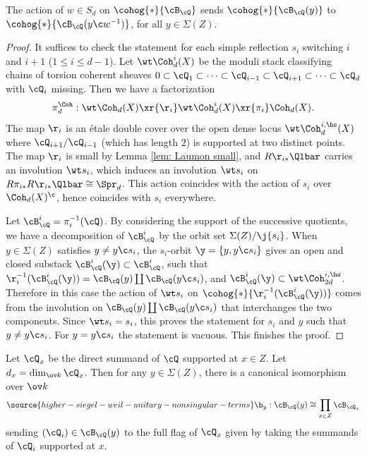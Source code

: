 \begin{lemma}
\notready\label{l:perm Coh}
The action of $w\in S_{d}$ on $\cohog{*}{\cB_{\cQ}}$ sends $\cohog{*}{\cB_{\cQ}(y)}$ to $\cohog{*}{\cB_{\cQ}(y\c w^{-1})}$, for all $y\in \Sigma(Z)$.
\end{lemma}
\begin{proof}
It suffices to check the statement for each simple reflection $s_{i}$ switching $i$ and $i+1$ ($1\le i\le d-1$). Let $\wt\Coh^{i}_{d}(X)$ be the moduli stack classifying chains of torsion coherent sheaves $0\subset\cQ_{1}\subset\cdots\subset\cQ_{i-1}\subset\cQ_{i+1}\subset\cdots \subset\cQ_{d}$ with $\cQ_{i}$ missing. Then we have a factorization
\begin{equation*}
\pi^{\Coh}_{d}: \wt\Coh_{d}(X)\xr{\r_{i}}\wt\Coh^{i}_{d}(X)\xr{\pi_{i}}\Coh_{d}(X).
\end{equation*}
The map $\r_{i}$ is an \'etale double cover over the open dense locus  $\wt\Coh^{i,\hs}_{d}(X)$  where $\cQ_{i+1}/\cQ_{i-1}$ (which has length $2$) is supported at two distinct points. The map $\r_{i}$ is small by Lemma \ref{lem: Laumon small}, and $R\r_{i*}\Qlbar$ carries an involution $\wt s_{i}$, which induces an involution $\wt s_{i}$ on $R\pi_{i*}R\r_{i*}\Qlbar\cong \Spr_{d}$. This action coincides with the action of $s_{i}$ over $\Coh_{d}(X)^{\c}$, hence coincides with $s_{i}$ everywhere.

Let $\cB_{\cQ}^{i}=\pi_{i}^{-1}(\cQ)$. By considering the support of the successive quotients, we have a decomposition of $\cB_{\cQ}^{i}$ by the orbit set $\Sigma(Z)/\j{s_{i}}$. When $y\in\Sigma(Z)$ satisfies $y\ne y\c s_{i}$, the $s_{i}$-orbit $\y=\{y,y\c s_{i}\}$ gives an open and closed substack $\cB^{i}_{\cQ}(\y)\subset \cB_{\cQ}^{i}$, such that $\r^{-1}_{i}(\cB^{i}_{\cQ}(\y))=\cB_{\cQ}(y)\coprod\cB_{\cQ}(y\c s_{i})$, and $\cB^{i}_{\cQ}(\y)\subset \wt\Coh^{i,\hs}_{2d}$. Therefore in this case the action of $\wt s_{i}$ on $\cohog{*}{\r^{-1}_{i}(\cB^{i}_{\cQ}(\y))}$ comes from the involution on $\cB_{\cQ}(y)\coprod\cB_{\cQ}(y\c s_{i})$ that interchanges the two components. Since $\wt s_{i}=s_{i}$, this proves the statement for $s_{i}$ and $y$ such that $y\ne y\c s_{i}$. For $y=y\c s_{i}$ the statement is vacuous. This finishes the proof.
\end{proof}

Let $\cQ_{x}$ be the direct summand of $\cQ$ supported at $x\in Z$. Let $d_{x}=\dim_{\ov k}\cQ_{x}$. Then for any $y\in \Sigma(Z)$, there is a canonical isomorphism over $\ov k$
\begin{equation}\label{BQy}
\source{higher-siegel-weil-unitary-nonsingular-terms}
\b_{y}: \cB_{\cQ}(y)\cong \prod_{x\in Z}\cB_{\cQ_{x}}
\end{equation}
sending $(\cQ_{i})\in \cB_{\cQ}(y)$ to the full flag of $\cQ_{x}$ given by taking the summands of $\cQ_{i}$ supported at $x$.


